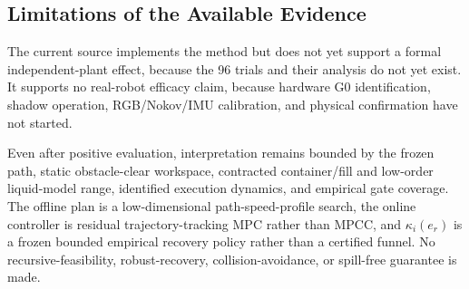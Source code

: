 \subsection{Limitations of the Available Evidence}

The current source implements the method but does not yet support a formal
independent-plant effect, because the 96 trials and their analysis do not yet
exist.  It supports no real-robot efficacy claim, because
hardware G0 identification, shadow operation, RGB/Nokov/IMU calibration, and
physical confirmation have not started.

Even after positive evaluation, interpretation remains bounded by the frozen
path, static obstacle-clear workspace, contracted container/fill and
low-order liquid-model range, identified execution dynamics, and empirical
gate coverage.  The offline plan is a low-dimensional path-speed-profile
search, the online controller is residual trajectory-tracking MPC rather than
MPCC, and $\kappa_i(e_r)$ is a frozen bounded empirical recovery policy rather
than a certified funnel.  No recursive-feasibility, robust-recovery,
collision-avoidance, or spill-free guarantee is made.
